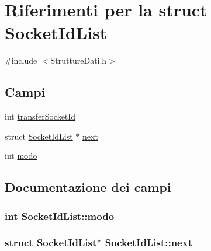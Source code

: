 \hypertarget{structSocketIdList}{}\section{Riferimenti per la struct Socket\+Id\+List}
\label{structSocketIdList}


{\ttfamily \#include $<$Strutture\+Dati.\+h$>$}

\subsection*{Campi}
\begin{DoxyCompactItemize}
\item 
int \hyperlink{structSocketIdList_a5a7568a90af3231f5c125ef0c63e47db}{transfer\+Socket\+Id}
\item 
struct \hyperlink{structSocketIdList}{Socket\+Id\+List} $\ast$ \hyperlink{structSocketIdList_a6a4ac9d91704e30a162d520bca97a270}{next}
\item 
int \hyperlink{structSocketIdList_a84ef1b1879e61c17fe09e27e2038d0ee}{modo}
\end{DoxyCompactItemize}


\subsection{Documentazione dei campi}
\subsubsection[{\texorpdfstring{modo}{modo}}]{\setlength{\rightskip}{0pt plus 5cm}int Socket\+Id\+List\+::modo}\hypertarget{structSocketIdList_a84ef1b1879e61c17fe09e27e2038d0ee}{}\label{structSocketIdList_a84ef1b1879e61c17fe09e27e2038d0ee}
\subsubsection[{\texorpdfstring{next}{next}}]{\setlength{\rightskip}{0pt plus 5cm}struct {\bf Socket\+Id\+List}$\ast$ Socket\+Id\+List\+::next}\hypertarget{structSocketIdList_a6a4ac9d91704e30a162d520bca97a270}{}\label{structSocketIdList_a6a4ac9d91704e30a162d520bca97a270}
